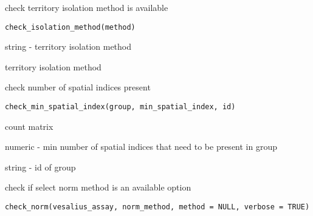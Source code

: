 \documentclass[a4paper]{book}
\begin{document}
%
\begin{Description}
check territory isolation method is available
\end{Description}
%
\begin{Usage}
\begin{verbatim}
check_isolation_method(method)
\end{verbatim}
\end{Usage}
%
\begin{Arguments}
\begin{ldescription}
\item[\code{method}] string - territory isolation method
\end{ldescription}
\end{Arguments}
%
\begin{Value}
territory isolation method
\end{Value}
%
\begin{Description}
check number of spatial indices present
\end{Description}
%
\begin{Usage}
\begin{verbatim}
check_min_spatial_index(group, min_spatial_index, id)
\end{verbatim}
\end{Usage}
%
\begin{Arguments}
\begin{ldescription}
\item[\code{group}] count matrix

\item[\code{min\_spatial\_index}] numeric - min number of spatial indices 
that need to be present in group

\item[\code{id}] string - id of group
\end{ldescription}
\end{Arguments}
%
\begin{Description}
check if select norm method is an available option
\end{Description}
%
\begin{Usage}
\begin{verbatim}
check_norm(vesalius_assay, norm_method, method = NULL, verbose = TRUE)
\end{verbatim}
\end{Usage}
\end{document}
